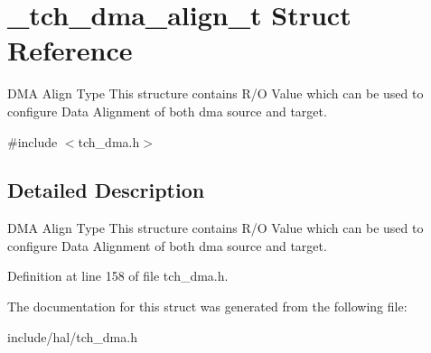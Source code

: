 \hypertarget{struct__tch__dma__align__t}{\section{\+\_\+tch\+\_\+dma\+\_\+align\+\_\+t Struct Reference}
\label{struct__tch__dma__align__t}
}


D\+M\+A Align Type This structure contains R/\+O Value which can be used to configure Data Alignment of both dma source and target.  




{\ttfamily \#include $<$tch\+\_\+dma.\+h$>$}



\subsection{Detailed Description}
D\+M\+A Align Type This structure contains R/\+O Value which can be used to configure Data Alignment of both dma source and target. 

Definition at line 158 of file tch\+\_\+dma.\+h.



The documentation for this struct was generated from the following file\+:\begin{DoxyCompactItemize}
\item 
include/hal/tch\+\_\+dma.\+h\end{DoxyCompactItemize}
